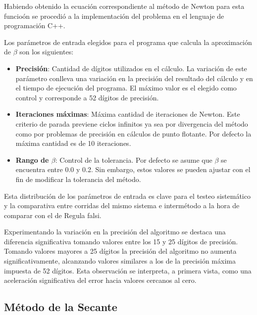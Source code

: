 Habiendo obtenido la ecuaci\'on correspondiente al m\'etodo de Newton para esta 
funcio\'on se procedi\'o a la implementaci\'on del problema en el lenguaje 
de programaci\'on C++.

Los par\'ametros de entrada elegidos para el programa que calcula la 
aproximaci\'on de $\beta$ son los siguientes:

\begin{itemize}
  \item \textbf{Precisi\'on}: Cantidad de d\'igitos utilizados en el c\'alculo. 
La variaci\'on de este par\'ametro conlleva una variaci\'on en la precisi\'on 
del resultado del c\'alculo y en el tiempo de ejecuci\'on del programa. 
El m\'aximo valor es el elegido como control y corresponde a 52 d\'igitos de 
precisi\'on.

  \item \textbf{Iteraciones m\'aximas}: M\'axima cantidad de iteraciones de 
Newton. Este criterio de parada previene ciclos infinitos ya sea por divergencia
del m\'etodo como por problemas de precisi\'on en c\'alculos de punto flotante. 
Por defecto la m\'axima cantidad es de 10 iteraciones.

  \item \textbf{Rango de $\beta$}: Control de la tolerancia. Por defecto 
se asume que $\beta$ se encuentra entre 0.0 y 0.2. Sin embargo, estos 
valores se pueden ajustar con el fin de modificar la tolerancia del m\'etodo.
\end{itemize}

Esta distribuci\'on de los par\'ametros de entrada es clave para el testeo 
sistem\'atico y la comparativa entre corridas del mismo sistema e 
interm\'etodo a la hora de comparar con el de Regula falsi.

Experimentando la variaci\'on en la precisi\'on del algoritmo se destaca una 
diferencia significativa tomando valores entre los 15 y 25 d\'igitos de 
precisi\'on. Tomando valores mayores a 25 d\'igitos la precisi\'on del 
algoritmo no aumenta significativamente, alcanzando valores similares a los 
de la precisi\'on m\'axima impuesta de 52 d\'igitos. 
Esta observaci\'on se interpreta, a primera vista, como una aceleraci\'on 
significativa del error hacia valores cercanos al cero.

\subsection{M\'etodo de la Secante}

